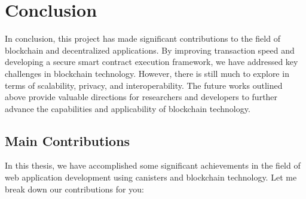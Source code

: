 \chapter{Conclusion}
\label{chap:todo}
In conclusion, this project has made significant contributions to the field of blockchain and decentralized applications. By improving transaction speed and developing a secure smart contract execution framework, we have addressed key challenges in blockchain technology. However, there is still much to explore in terms of scalability, privacy, and interoperability. The future works outlined above provide valuable directions for researchers and developers to further advance the capabilities and applicability of blockchain technology.
\section{Main Contributions}
In this thesis, we have accomplished some significant achievements in the field of web application development using canisters and blockchain technology. Let me break down our contributions for you:

